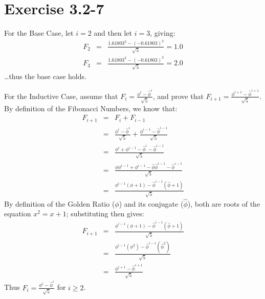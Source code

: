 \documentclass{article}
\begin{document}
\section*{Exercise 3.2-7}

For the Base Case, let $i = 2$ and then let $i = 3$, giving:
\begin{eqnarray*}
	F_2 & = & \frac{1.61803^2 - (-0.61803)^2}{\sqrt{5}} = 1.0 \\
	F_3 & = & \frac{1.61803^3 - (-0.61803)^3}{\sqrt{5}} = 2.0
\end{eqnarray*}
\ldots thus the base case holds.

For the Inductive Case, assume that $F_i = \frac{\phi^i - \hat{\phi}^i}{\sqrt{5}}$, and prove that $F_{i+1} = \frac{\phi^{i+1} - \hat{\phi}^{i+1}}{\sqrt{5}}$. By definition of the Fibonacci Numbers, we know that:
\begin{eqnarray*}
	F_{i+1} & = & F_i + F_{i-1} \\
	& = & \frac{\phi^i - \hat{\phi}^i}{\sqrt{5}} + \frac{\phi^{i-1} - \hat{\phi}^{i-1}}{\sqrt{5}} \\
	& = & \frac{\phi^i + \phi^{i-1} - \hat{\phi}^i - \hat{\phi}^{i-1}}{\sqrt{5}} \\
	& = & \frac{\phi \phi^{i-1} + \phi^{i-1} - \hat{\phi} \hat{\phi}^{i-1} - \hat{\phi}^{i-1}}{\sqrt{5}} \\
	& = & \frac{\phi^{i-1} \left(\phi + 1 \right) - \hat{\phi}^{i-1} ( \hat{\phi} + 1)}{\sqrt{5}}
\end{eqnarray*}
By definition of the Golden Ratio ($\phi$) and its conjugate ($\hat\phi$), both are roots of the equation $x^2 = x + 1$; substituting then gives:
\begin{eqnarray*}
	F_{i+1} & = & \frac{\phi^{i-1} \left(\phi + 1 \right) - \hat{\phi}^{i-1} ( \hat{\phi} + 1)}{\sqrt{5}} \\
	& = & \frac{\phi^{i-1}(\phi^2) - \hat{\phi}^{i-1}(\hat\phi^2)}{\sqrt{5}} \\
	& = & \frac{\phi^{i+1} - \hat{\phi}^{i+1}}{\sqrt{5}}
\end{eqnarray*}
Thus $F_i = \frac{\phi^i - \hat{\phi}^i}{\sqrt{5}}$ for $i \geq 2$.
\end{document}
